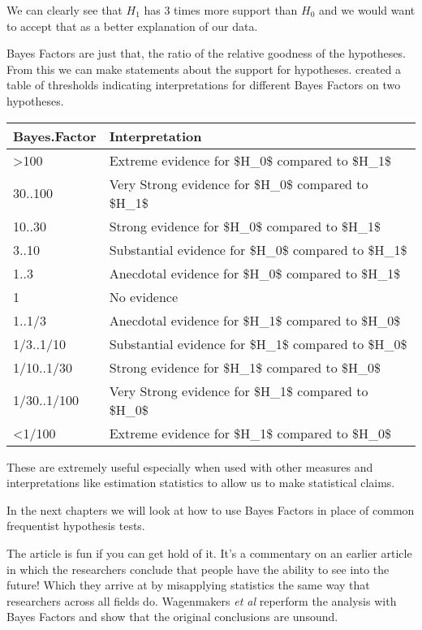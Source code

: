 \documentclass[
]{book}
\newenvironment{sidenote}
{ \begin{tcolorbox}[colbacktitle=blue!50!white,
title=huh?,coltitle=white,
fonttitle=\bfseries] }
{  \end{tcolorbox} }
\begin{document}
We can clearly see that \(H_1\) has 3 times more support than \(H_0\) and we would want to accept that as a better explanation of our data.

Bayes Factors are just that, the ratio of the relative goodness of the hypotheses. From this we can make statements about the support for hypotheses. \citet{wagenmakers2011} created a table of thresholds indicating interpretations for different Bayes Factors on two hypotheses.

\begin{tabular}{l|l}
\hline
Bayes.Factor & Interpretation\\
\hline
>100 & Extreme  evidence for \$H\_0\$ compared to \$H\_1\$\\
\hline
30..100 & Very Strong  evidence for \$H\_0\$ compared to \$H\_1\$\\
\hline
10..30 & Strong  evidence for \$H\_0\$ compared to \$H\_1\$\\
\hline
3..10 & Substantial  evidence for \$H\_0\$ compared to \$H\_1\$\\
\hline
1..3 & Anecdotal  evidence for \$H\_0\$ compared to \$H\_1\$\\
\hline
1 & No evidence\\
\hline
1..1/3 & Anecdotal  evidence for \$H\_1\$ compared to \$H\_0\$\\
\hline
1/3..1/10 & Substantial  evidence for \$H\_1\$ compared to \$H\_0\$\\
\hline
1/10..1/30 & Strong  evidence for \$H\_1\$ compared to \$H\_0\$\\
\hline
1/30..1/100 & Very Strong  evidence for \$H\_1\$ compared to \$H\_0\$\\
\hline
<1/100 & Extreme  evidence for \$H\_1\$ compared to \$H\_0\$\\
\hline
\end{tabular}

These are extremely useful especially when used with other measures and interpretations like estimation statistics to allow us to make statistical claims.

In the next chapters we will look at how to use Bayes Factors in place of common frequentist hypothesis tests.

\begin{sidenote}
The \citet{wagenmakers2011} article is fun if you can get hold of it. It's a commentary on an earlier article in which the researchers conclude that people have the ability to see into the future! Which they arrive at by misapplying statistics the same way that researchers across all fields do. Wagenmakers \emph{et al} reperform the analysis with Bayes Factors and show that the original conclusions are unsound.
\end{sidenote}
\end{document}
